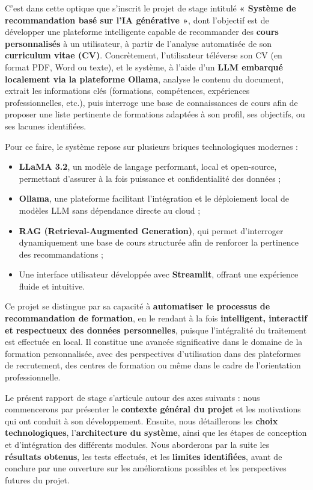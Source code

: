 C’est dans cette optique que s’inscrit le projet de stage intitulé \textbf{« Système de recommandation basé sur l’IA générative »}, dont l’objectif est de développer une plateforme intelligente capable de recommander des \textbf{cours personnalisés} à un utilisateur, à partir de l’analyse automatisée de son \textbf{curriculum vitae (CV)}. Concrètement, l’utilisateur téléverse son CV (en format PDF, Word ou texte), et le système, à l’aide d’un \textbf{LLM embarqué localement via la plateforme Ollama}, analyse le contenu du document, extrait les informations clés (formations, compétences, expériences professionnelles, etc.), puis interroge une base de connaissances de cours afin de proposer une liste pertinente de formations adaptées à son profil, ses objectifs, ou ses lacunes identifiées.

Pour ce faire, le système repose sur plusieurs briques technologiques modernes :
\begin{itemize}
    \item \textbf{LLaMA 3.2}, un modèle de langage performant, local et open-source, permettant d’assurer à la fois puissance et confidentialité des données ;
    \item \textbf{Ollama}, une plateforme facilitant l’intégration et le déploiement local de modèles LLM sans dépendance directe au cloud ;
    \item \textbf{RAG (Retrieval-Augmented Generation)}, qui permet d’interroger dynamiquement une base de cours structurée afin de renforcer la pertinence des recommandations ;
    \item Une interface utilisateur développée avec \textbf{Streamlit}, offrant une expérience fluide et intuitive.
\end{itemize}

Ce projet se distingue par sa capacité à \textbf{automatiser le processus de recommandation de formation}, en le rendant à la fois \textbf{intelligent, interactif et respectueux des données personnelles}, puisque l’intégralité du traitement est effectuée en local. Il constitue une avancée significative dans le domaine de la formation personnalisée, avec des perspectives d’utilisation dans des plateformes de recrutement, des centres de formation ou même dans le cadre de l’orientation professionnelle.

Le présent rapport de stage s’articule autour des axes suivants : nous commencerons par présenter le \textbf{contexte général du projet} et les motivations qui ont conduit à son développement. Ensuite, nous détaillerons les \textbf{choix technologiques}, l’\textbf{architecture du système}, ainsi que les étapes de conception et d’intégration des différents modules. Nous aborderons par la suite les \textbf{résultats obtenus}, les tests effectués, et les \textbf{limites identifiées}, avant de conclure par une ouverture sur les améliorations possibles et les perspectives futures du projet.
